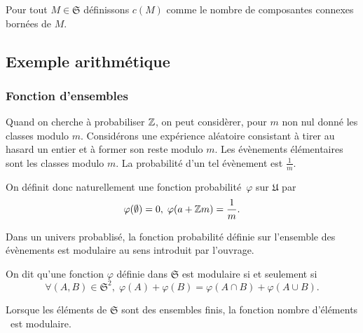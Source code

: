 \begin{defi}
Pour tout $M \in \mathfrak{S}$ définissons $c(M)$ comme le nombre de composantes connexes bornées de $M$.
\end{defi}

\subsection{Exemple arithmétique}
\subsubsection{Fonction d'ensembles}
Quand on cherche à probabiliser $\mathbb{Z}$, on peut considèrer, pour $m$ non nul donné les classes modulo $m$. Considérons une expérience aléatoire consistant à tirer au hasard un entier et à former son reste modulo $m$. Les évènements élémentaires sont les classes modulo $m$. La probabilité d'un tel évènement est $\frac{1}{m}$.

On définit donc naturellement une fonction \og probabilité\fg \, $\varphi$ sur $\mathfrak{U}$ par
\begin{displaymath}
  \varphi(\emptyset) = 0, \;\varphi(a + \mathbb{Z} m) = \frac{1}{m}.
\end{displaymath}

Dans un univers probablisé, la fonction probabilité définie sur l'ensemble des évènements est modulaire au sens introduit par l'ouvrage.
\begin{defi}
  On dit qu'une fonction $\varphi$ définie dans $\mathfrak{S}$ est modulaire si et seulement si
  \begin{displaymath}
    \forall (A,B)\in \mathfrak{S}^2,\; \varphi(A) + \varphi(B) = \varphi(A\cap B) + \varphi(A \cup B).
  \end{displaymath}
\end{defi}
\begin{rem}
  Lorsque les éléments de $\mathfrak{S}$ sont des ensembles finis, la fonction \og nombre d'éléments \fg \, est modulaire.
\end{rem}

